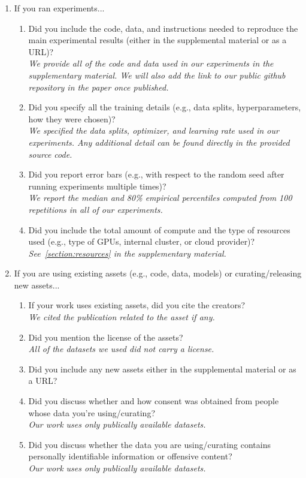 \begin{enumerate}
\item If you ran experiments...
\begin{enumerate}
  \item Did you include the code, data, and instructions needed to reproduce the main experimental results (either in the supplemental material or as a URL)?
    \answerYes{} \\
    \textit{We provide all of the code and data used in our experiments in the supplementary material.
    We will also add the link to our public github repository in the paper once published.}
  \item Did you specify all the training details (e.g., data splits, hyperparameters, how they were chosen)?
    \answerYes{} \\
    \textit{We specified the data splits, optimizer, and learning rate used in our experiments.
    Any additional detail can be found directly in the provided source code.}
  \item Did you report error bars (e.g., with respect to the random seed after running experiments multiple times)?
    \answerYes{} \\
    \textit{We report the median and 80\% empirical percentiles computed from 100 repetitions in all of our experiments.}
     \item Did you include the total amount of compute and the type of resources used (e.g., type of GPUs, internal cluster, or cloud provider)? 
     \answerYes{} \\
     \textit{See~\cref{section:resources} in the supplementary material.}
\end{enumerate}

\item If you are using existing assets (e.g., code, data, models) or curating/releasing new assets...
\begin{enumerate}
  \item If your work uses existing assets, did you cite the creators?
    \answerYes{} \\
    \textit{We cited the publication related to the asset if any.}
  \item Did you mention the license of the assets?
    \answerNo{} \\
    \textit{All of the datasets we used did not carry a license.}
  \item Did you include any new assets either in the supplemental material or as a URL?
    \answerNo{}
  \item Did you discuss whether and how consent was obtained from people whose data you're using/curating?
    \answerNA{} \\
    \textit{Our work uses only publically available datasets.}
  \item Did you discuss whether the data you are using/curating contains personally identifiable information or offensive content?
    \answerNA{} \\
    \textit{Our work uses only publically available datasets.}
\end{enumerate}


\end{enumerate}

